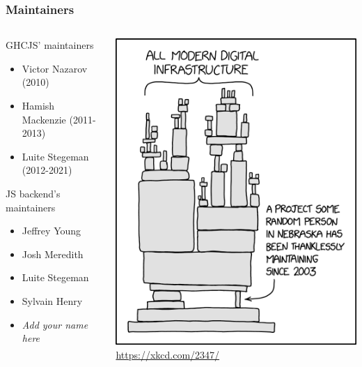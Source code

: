 \documentclass[aspectratio=169]{beamer}
\begin{document}
\begin{frame}
\frametitle{Maintainers}
\begin{columns}

\begin{column}{0.6\textwidth}
GHCJS’ maintainers
\begin{itemize}
\item Victor Nazarov (2010)
\item Hamish Mackenzie (2011-2013)
\item Luite Stegeman (2012-2021)
\end{itemize}

JS backend’s maintainers
\begin{itemize}
\item Jeffrey Young
\item Josh Meredith
\item Luite Stegeman
\item Sylvain Henry
\item \textit{Add your name here}
\end{itemize}
\end{column}

\begin{column}{0.4\textwidth}
\begin{center}
\includegraphics[scale=0.3]{images/xkcd_2347.png}
\tiny\url{https://xkcd.com/2347/}
\end{center}
\end{column}

\end{columns}

\end{frame}
\end{document}
